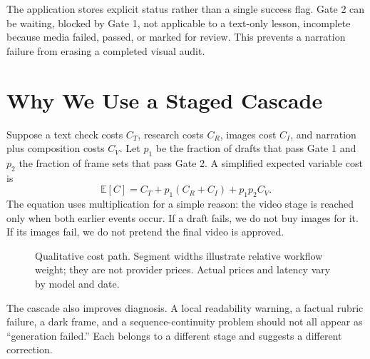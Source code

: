 \documentclass[11pt]{article}
\theoremstyle{plain}
\theoremstyle{definition}
\begin{document}
The application stores explicit status rather than a single success flag. Gate 2 can be waiting, blocked by Gate 1, not applicable to a text-only lesson, incomplete because media failed, passed, or marked for review. This prevents a narration failure from erasing a completed visual audit.

\section{Why We Use a Staged Cascade}

Suppose a text check costs $C_T$, research costs $C_R$, images cost $C_I$, and narration plus composition costs $C_V$. Let $p_1$ be the fraction of drafts that pass Gate 1 and $p_2$ the fraction of frame sets that pass Gate 2. A simplified expected variable cost is
\begin{equation}
  \mathbb{E}[C]=C_T+p_1(C_R+C_I)+p_1p_2C_V.
  \label{eq:expected-cost}
\end{equation}
The equation uses multiplication for a simple reason: the video stage is reached only when both earlier events occur. If a draft fails, we do not buy images for it. If its images fail, we do not pretend the final video is approved.

\begin{figure}[H]
\centering
{}
\caption{Qualitative cost path. Segment widths illustrate relative workflow weight; they are not provider prices. Actual prices and latency vary by model and date.}
\label{fig:cost}
\end{figure}

The cascade also improves diagnosis. A local readability warning, a factual rubric failure, a dark frame, and a sequence-continuity problem should not all appear as ``generation failed.'' Each belongs to a different stage and suggests a different correction.
\end{document}
